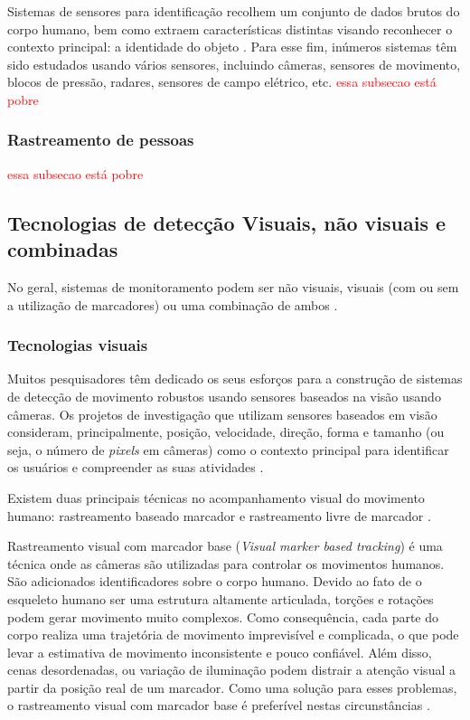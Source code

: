 Sistemas de sensores para identificação recolhem um conjunto de dados brutos do corpo humano, bem como extraem características distintas visando reconhecer o contexto principal: a identidade do objeto \cite{yun2014human}. Para esse fim, inúmeros sistemas têm sido estudados usando vários sensores, incluindo câmeras, sensores de movimento, blocos de pressão, radares, sensores de campo elétrico, etc.
\textcolor{red}{essa subsecao está pobre}
 
\subsubsection{Rastreamento de pessoas}\label{sec:rastre-amb-fec}

 \textcolor{red}{essa subsecao está pobre}

\subsection{Tecnologias de detecção Visuais, não visuais e combinadas}\label{sec:tec-rastreamento}
No geral, sistemas de monitoramento podem ser não visuais, visuais (com ou sem a utilização de marcadores) ou uma combinação de ambos \cite{zhou2008human}.

\subsubsection{Tecnologias visuais}\label{sec:sens-genericos}
Muitos pesquisadores têm dedicado os seus esforços para a construção de sistemas de detecção de movimento robustos usando sensores baseados na visão usando câmeras. Os projetos de investigação que utilizam sensores baseados em visão consideram, principalmente, posição, velocidade, direção, forma e tamanho (ou seja, o número de \textit{pixels} em câmeras) como o contexto principal para identificar os usuários e compreender as suas atividades \cite{stauffer200l}.

Existem duas principais técnicas no acompanhamento visual do movimento humano: rastreamento baseado marcador e rastreamento livre de marcador \cite{YTao2010}.

Rastreamento visual com marcador base (\textit{Visual marker based tracking}) é uma técnica onde as câmeras são utilizadas para controlar os movimentos humanos. São adicionados identificadores sobre o corpo humano. Devido ao fato de o esqueleto humano ser uma estrutura altamente articulada, torções e rotações podem gerar movimento muito complexos. Como consequência, cada parte do corpo realiza uma trajetória de movimento imprevisível e complicada, o que pode levar a estimativa de movimento inconsistente e pouco confiável. Além disso, cenas desordenadas, ou variação de iluminação podem distrair a atenção visual a partir da posição real de um marcador. Como uma solução para esses problemas, o rastreamento visual com marcador base é preferível nestas circunstâncias \cite{zhang2002visual}.

